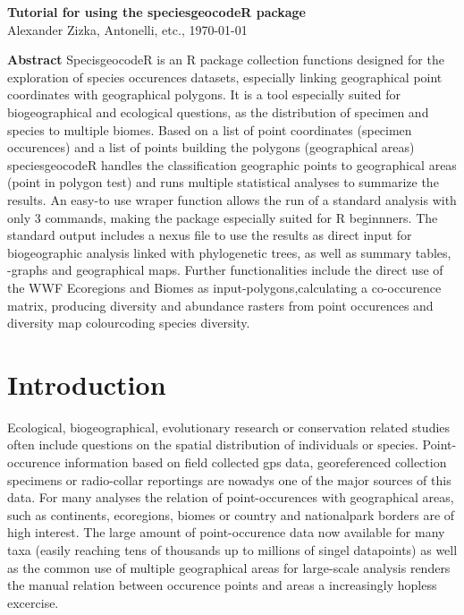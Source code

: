 \documentclass[a4paper,titlepage,11pt]{scrreprt}
\begin{document}
\begin{titlepage}
\vspace*{1cm}
\begin{center}
\huge
\textbf{Tutorial for using the speciesgeocodeR package}\\
\vspace{1cm}
\Large {Alexander Zizka, Antonelli, etc.,  \today} \\
\end{center}

\vspace{1.5cm}
\Large

\normalsize

\textbf{Abstract}  SpecisgeocodeR is an R package collection functions designed for the exploration of species occurences datasets, especially linking geographical point coordinates with geographical polygons. It is a tool especially suited for biogeographical and ecological questions, as the distribution of specimen and species to multiple biomes. Based on a list of point coordinates (specimen occurences) and a list of points building the polygons (geographical areas) speciesgeocodeR handles the classification geographic points to geographical areas (point in polygon test) and runs multiple statistical analyses to summarize the results. An easy-to use wraper function allows the run of a standard analysis with only 3 commands, making the package especially suited for R beginnners. The standard output includes a nexus file to use the results as direct input for biogeographic analysis linked with phylogenetic trees, as well as summary tables, -graphs and geographical maps. Further functionalities include the direct use of the WWF Ecoregions and Biomes as input-polygons,calculating a co-occurence matrix, producing diversity and abundance rasters from point occurences and diversity map colourcoding species diversity.

\end{titlepage}

\tableofcontents

\chapter{Introduction}

Ecological, biogeographical, evolutionary research or conservation related studies often include questions on the spatial distribution of individuals or species. Point-occurence information based on field collected gps data, georeferenced collection specimens or radio-collar reportings are nowadys one of the major sources of this data. For many analyses the relation of point-occurences with geographical areas, such as continents, ecoregions, biomes or country and nationalpark borders are of high interest. The large amount of point-occurence data now available for many taxa (easily reaching tens of thousands up to millions of singel datapoints) as well as the common use of multiple geographical areas for large-scale analysis renders the manual relation between occurence points and areas a increasingly hopless excercise.
\end{document}

